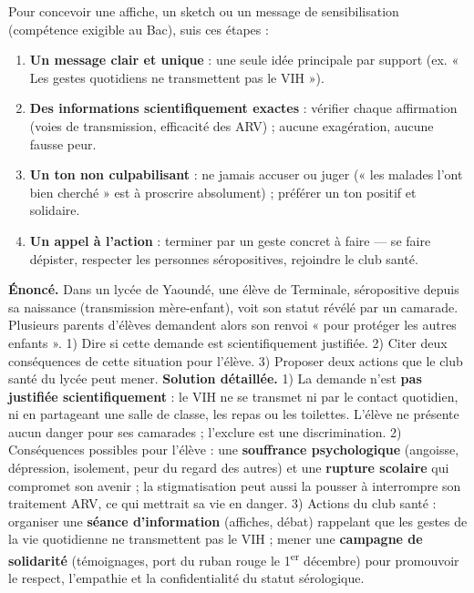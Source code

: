 \documentclass[11pt]{article}
\begin{document}
\begin{methode}
Pour concevoir une affiche, un sketch ou un message de sensibilisation (compétence exigible au Bac), suis ces étapes :
\begin{enumerate}
\item \textbf{Un message clair et unique} : une seule idée principale par support (ex. « Les gestes quotidiens ne transmettent pas le VIH »).
\item \textbf{Des informations scientifiquement exactes} : vérifier chaque affirmation (voies de transmission, efficacité des ARV) ; aucune exagération, aucune fausse peur.
\item \textbf{Un ton non culpabilisant} : ne jamais accuser ou juger (« les malades l'ont bien cherché » est à proscrire absolument) ; préférer un ton positif et solidaire.
\item \textbf{Un appel à l'action} : terminer par un geste concret à faire — se faire dépister, respecter les personnes séropositives, rejoindre le club santé.
\end{enumerate}
\end{methode}

\begin{exoresolu}
\textbf{Énoncé.} Dans un lycée de Yaoundé, une élève de Terminale, séropositive depuis sa naissance (transmission mère-enfant), voit son statut révélé par un camarade. Plusieurs parents d'élèves demandent alors son renvoi « pour protéger les autres enfants ». 1) Dire si cette demande est scientifiquement justifiée. 2) Citer deux conséquences de cette situation pour l'élève. 3) Proposer deux actions que le club santé du lycée peut mener.
\tcblower
\textbf{Solution détaillée.}
1) La demande n'est \textbf{pas justifiée scientifiquement} : le VIH ne se transmet ni par le contact quotidien, ni en partageant une salle de classe, les repas ou les toilettes. L'élève ne présente aucun danger pour ses camarades ; l'exclure est une discrimination.
2) Conséquences possibles pour l'élève : une \textbf{souffrance psychologique} (angoisse, dépression, isolement, peur du regard des autres) et une \textbf{rupture scolaire} qui compromet son avenir ; la stigmatisation peut aussi la pousser à interrompre son traitement ARV, ce qui mettrait sa vie en danger.
3) Actions du club santé : organiser une \textbf{séance d'information} (affiches, débat) rappelant que les gestes de la vie quotidienne ne transmettent pas le VIH ; mener une \textbf{campagne de solidarité} (témoignages, port du ruban rouge le 1\textsuperscript{er} décembre) pour promouvoir le respect, l'empathie et la confidentialité du statut sérologique.
\end{exoresolu}
\end{document}
